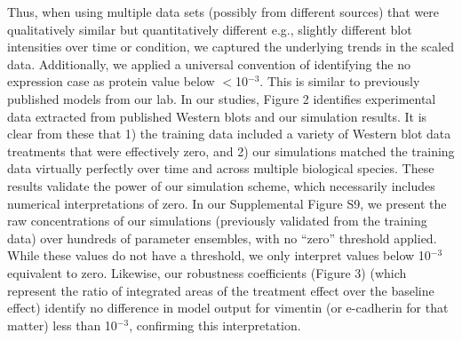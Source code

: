\documentclass[12pt]{article}
\begin{document}
Thus, when using multiple data sets (possibly from different sources) that were qualitatively similar but quantitatively different e.g., slightly different blot intensities over time or condition, we captured the underlying trends in the scaled data. Additionally, we applied a universal convention of identifying the no expression case as protein value below $<$10$^{-3}$. This is similar to previously published models from our lab. In our studies, Figure 2 identifies experimental data extracted from published Western blots and our simulation results. It is clear from these that 1) the training data included a variety of Western blot data treatments that were effectively zero, and 2) our simulations matched the training data virtually perfectly over time and across multiple biological species. These results validate the power of our simulation scheme, which necessarily includes numerical interpretations of zero. In our Supplemental Figure S9, we present the raw concentrations of our simulations (previously validated from the training data) over hundreds of parameter ensembles, with no “zero” threshold applied.  While these values do not have a threshold, we only interpret values below 10$^{-3}$ equivalent to zero. Likewise, our robustness coefficients (Figure 3) (which represent the ratio of integrated areas of the treatment effect over the baseline effect) identify no difference in model output for vimentin (or e-cadherin for that matter) less than 10$^{-3}$, confirming this interpretation.
\end{document}
